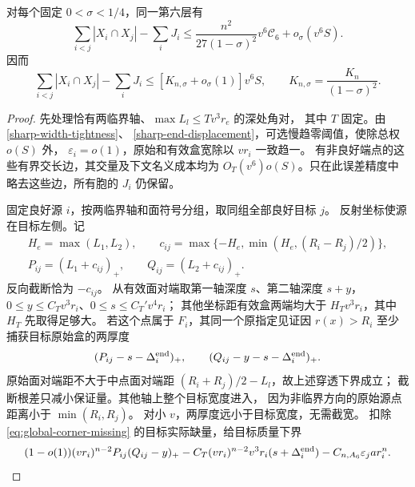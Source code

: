 \begin{lemma}[同层全部交长的锐价格]\label{sharp-source-price}
对每个固定 \(0<\sigma<1/4\)，同一第六层有
\begin{equation}\label{sharp-price-contact}
 \sum_{i<j}|X_i\cap X_j|-\sum_iJ_i
 \le\frac{n^2}{27(1-\sigma)^2}v^6\mathcal C_6
       +o_\sigma(v^6S).
\end{equation}
因而
\begin{equation}\label{sharp-price}
 \sum_{i<j}|X_i\cap X_j|-\sum_iJ_i
 \le[K_{n,\sigma}+o_\sigma(1)]v^6S,\qquad
 K_{n,\sigma}=\frac{K_n}{(1-\sigma)^2}.
\end{equation}
\end{lemma}
\begin{proof}
先处理恰有两临界轴、\(\max L_l\le Tv^3r_e\) 的深处角对，
其中 \(T\) 固定。由 \eqref{sharp-width-tightness}、
\eqref{sharp-end-displacement}，可选慢趋零阈值，使除总权 \(o(S)\) 外，
\(\varepsilon_i=o(1)\)，原始和有效盒宽除以 \(vr_i\) 一致趋一。
有非良好端点的这些有界交长边，其交量及下文名义成本均为
\(O_T(v^6)o(S)\)。只在此误差精度中略去这些边，所有胞的 \(J_i\) 仍保留。

固定良好源 \(i\)，按两临界轴和面符号分组，取同组全部良好目标 \(j\)。
反射坐标使源在目标左侧。记
\[
 \begin{gathered}
 H_e=\max(L_1,L_2),\qquad
 c_{ij}=\max\{-H_e,\min(H_e,(R_i-R_j)/2)\},\\
 P_{ij}=(L_1+c_{ij})_+,\qquad Q_{ij}=(L_2+c_{ij})_+.
 \end{gathered}
\]
反向截断恰为 \(-c_{ij}\)。
从有效面对端取第一轴深度 \(s\)、第二轴深度 \(s+y\)，
\(0\le y\le C_Tv^3r_i\)、\(0\le s\le C_T'v^4r_i\)；
其他坐标距有效盒两端均大于 \(H_Tv^3r_i\)，其中 \(H_T\) 先取得足够大。
若这个点属于 \(F_i\)，其同一个原指定见证因 \(r(x)>R_i\)
至少捕获目标原始盒的两厚度
\[
 (P_{ij}-s-\Delta_i^{\rm end})_+,\qquad
 (Q_{ij}-y-s-\Delta_i^{\rm end})_+.
\]
原始面对端距不大于中点面对端距
\((R_i+R_j)/2-L_l\)，故上述穿透下界成立；
截断根差只减小保证量。其他轴上整个目标宽度进入，
因为非临界方向的原始源点距离小于 \(\min(R_i,R_j)\)。
对小 \(v\)，两厚度远小于目标宽度，无需截宽。
扣除 \eqref{eq:global-corner-missing} 的目标实际缺量，给目标质量下界
\[
 (1-o(1))(vr_i)^{n-2}P_{ij}(Q_{ij}-y)_+
 -C_T(vr_i)^{n-2}v^3r_i(s+\Delta_i^{\rm end})
 -C_{n,A_6}\varepsilon_j ar_i^n.
\]


\end{proof}
